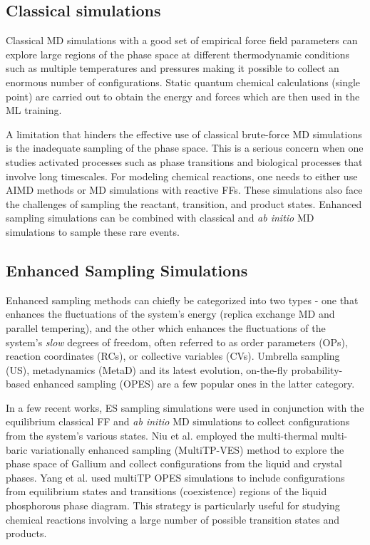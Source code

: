 \documentclass[9pt,bestpractices]{livecoms}
\begin{document}
\subsection{Classical simulations}
Classical MD simulations with a good set of empirical force field parameters can explore large regions of the phase space at different thermodynamic conditions such as multiple temperatures and pressures making it possible to collect an enormous number of configurations. Static quantum chemical calculations (single point) are carried out to obtain the energy and forces which are then used in the ML training. 

A limitation that hinders the effective use of classical brute-force MD simulations is the inadequate sampling of the phase space. This is a serious concern when one studies activated processes such as phase transitions and biological processes that involve long timescales. For modeling chemical reactions, one needs to either use AIMD methods or MD simulations with reactive FFs. These simulations also face the challenges of sampling the reactant, transition, and product states. Enhanced sampling simulations can be combined with classical and {\em ab initio} MD simulations to sample these rare events.\\

\subsection{Enhanced Sampling Simulations}
Enhanced sampling methods can chiefly be categorized into two types - one that enhances the fluctuations of the system's energy (replica exchange MD and parallel tempering), and the other which enhances the fluctuations of the system's {\em slow} degrees of freedom, often referred to as order parameters (OPs), reaction coordinates (RCs), or collective variables (CVs). Umbrella sampling (US), metadynamics (MetaD) and its latest evolution, on-the-fly probability-based enhanced sampling (OPES) are a few popular ones in the latter category. 

In a few recent works, ES sampling simulations were used in conjunction with the equilibrium classical FF and {\em ab initio} MD simulations to collect configurations from the system's various states. Niu {et al.} employed the multi-thermal multi-baric variationally enhanced sampling (MultiTP-VES) method to explore the phase space of Gallium and collect configurations from the liquid and crystal phases. Yang {et al.} used multiTP OPES simulations to include configurations from equilibrium states and transitions (coexistence) regions of the liquid phosphorous phase diagram. This strategy is particularly useful for studying chemical reactions involving a large number of possible transition states and products. 
\end{document}
